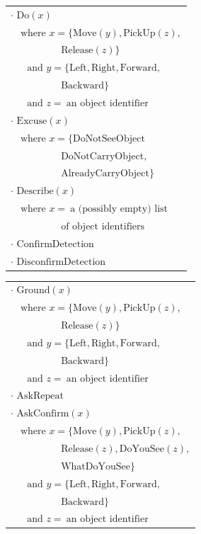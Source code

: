 \begin{table}[p]
\begin{footnotesize}
\begin{tabular}{p{60mm}} 
$\cdot$ $\mathrm{Do}(x) $ \\ $ \ \ \ \text{ where } x=\{\mathrm{Move}(y),\mathrm{PickUp}(z),$  \\ $\ \ \ \ \ \ \ \ \ \ \ \ \ \ \ \ \ \ \ \ \ \ \ \mathrm{Release}(z)\} $ \\ $ \ \ \ \ \ \ \text{ and } y = \{\mathrm{Left,Right,Forward,}$ \\ $ \ \ \ \ \ \ \ \ \ \ \ \ \ \ \ \ \ \ \ \ \ \ \ \mathrm{Backward}\} $ \\ $ \ \ \ \ \ \  \text{ and } z = \ \text{an object identifier}$ \\
$\cdot$ $\mathrm{Excuse}(x) $ \\ $ \ \ \  \text{ where } x = \{\mathrm{DoNotSeeObject}$ \\ $\ \ \ \ \ \ \ \ \ \ \ \ \ \ \ \ \ \ \ \ \ \ \ \mathrm{DoNotCarryObject,}$ \\ $\ \ \ \ \ \ \ \ \ \ \ \ \ \ \ \ \ \ \ \ \ \ \ \mathrm{AlreadyCarryObject}\}$ \\
$\cdot$ $\mathrm{Describe}(x) $ \\ $ \ \ \  \text{ where } x = \ \text{a (possibly empty) list}$ \\ $ \ \ \ \ \ \ \ \ \ \ \ \ \ \ \ \ \ \ \ \ \ \ \  \text{of object identifiers}$ \\
$\cdot$ $\mathrm{ConfirmDetection}$ \\
$\cdot$ $\mathrm{DisconfirmDetection}$ 
\end{tabular}
\hspace{2cm}
\begin{tabular}{p{60mm}} 
$\cdot$ $\mathrm{Ground}(x) $ \\ $ \ \ \ \text{ where } x=\{\mathrm{Move}(y),\mathrm{PickUp}(z),$  \\ $\ \ \ \ \ \ \ \ \ \ \ \ \ \ \ \ \ \ \ \ \ \ \ \mathrm{Release}(z)\} $ \\ $\ \ \ \ \ \  \text{ and } y = \{\mathrm{Left,Right,Forward,}$ \\ $\ \ \ \ \ \ \ \ \ \ \ \ \ \ \ \ \ \ \ \ \ \ \  \mathrm{Backward}\} $ \\ $\ \  \ \ \ \ \text{ and } z = \ \text{an object identifier}$ \\
$\cdot$ $\mathrm{AskRepeat}$ \\
$\cdot$ $\mathrm{AskConfirm}(x) $ \\ $\ \ \ \text{ where } x=\{\mathrm{Move}(y),\mathrm{PickUp}(z),$  \\ $\ \ \ \ \ \ \ \ \ \ \ \ \ \ \ \ \ \ \ \ \ \ \ \mathrm{Release}(z), \mathrm{DoYouSee}(z),$ \\ $ \ \ \ \ \ \ \ \ \ \ \ \ \ \ \ \ \ \ \ \ \ \ \ \mathrm{WhatDoYouSee} \} $ \\ $\ \ \ \ \ \  \text{ and } y = \{\mathrm{Left,Right,Forward,}$ \\ $\ \ \ \ \ \ \ \ \ \ \ \ \ \ \ \ \ \ \ \ \ \ \  \mathrm{Backward}\} $ \\ $\ \ \ \ \ \  \text{ and } z = \ \text{an object identifier}$ \

\end{tabular}
\end{footnotesize}
\end{table}

